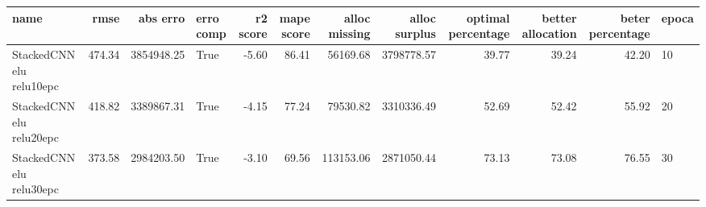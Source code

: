 \begin{tabular}{lrrlrrrrrrrl}
\toprule
name & rmse & abs erro & erro comp & r2 score & mape score & alloc missing & alloc surplus & optimal percentage & better allocation & beter percentage & epoca \\
\midrule
StackedCNN elu relu10epc & 474.34 & 3854948.25 & True & -5.60 & 86.41 & 56169.68 & 3798778.57 & 39.77 & 39.24 & 42.20 & 10 \\
StackedCNN elu relu20epc & 418.82 & 3389867.31 & True & -4.15 & 77.24 & 79530.82 & 3310336.49 & 52.69 & 52.42 & 55.92 & 20 \\
StackedCNN elu relu30epc & 373.58 & 2984203.50 & True & -3.10 & 69.56 & 113153.06 & 2871050.44 & 73.13 & 73.08 & 76.55 & 30 \\
\bottomrule
\end{tabular}
